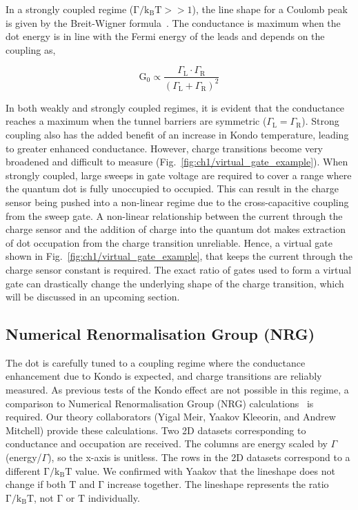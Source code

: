In a strongly coupled regime ($\mathrm{\Gamma/k_BT}>>1$), the line shape for a Coulomb peak is given by the Breit-Wigner formula~\cite{Breit1936}. The conductance is maximum when the dot energy is in line with the Fermi energy of the leads and depends on the coupling as,

\begin{equation}\label{eq:cond_amp_strong}
 \mathrm{G_0} \propto
 \frac{\Gamma_\mathrm{L}\cdot\Gamma_\mathrm{R}}{\left(\Gamma_\mathrm{L}+\Gamma_\mathrm{R}\right)^2}
\end{equation}

\noindent In both weakly and strongly coupled regimes, it is evident that the conductance reaches a maximum when the tunnel barriers are symmetric ($\Gamma_\mathrm{L}=\Gamma_\mathrm{R}$). Strong coupling also has the added benefit of an increase in Kondo temperature, leading to greater enhanced conductance. 
However, charge transitions become very broadened and difficult to measure (Fig.~\ref{fig:ch1/virtual_gate_example}). When strongly coupled, large sweeps in gate voltage are required to cover a range where the quantum dot is fully unoccupied to occupied. This can result in the charge sensor being pushed into a non-linear regime due to the cross-capacitive coupling from the sweep gate.
A non-linear relationship between the current through the charge sensor and the addition of charge into the quantum dot makes extraction of dot occupation from the charge transition unreliable. Hence, a virtual gate shown in Fig.~\ref{fig:ch1/virtual_gate_example}, that keeps the current through the charge sensor constant is required. The exact ratio of gates used to form a virtual gate can drastically change the underlying shape of the charge transition, which will be discussed in an upcoming section. 


\subsection{Numerical Renormalisation Group (NRG)}
The dot is carefully tuned to a coupling regime where the conductance enhancement due to Kondo is expected, and charge transitions are reliably measured. As previous tests of the Kondo effect are not possible in this regime, a comparison to Numerical Renormalisation Group (NRG) calculations~\cite{nrg} is required. Our theory collaborators (Yigal Meir, Yaakov Kleeorin, and Andrew Mitchell) provide these calculations. Two 2D datasets corresponding to conductance and occupation are received. The columns are energy scaled by $\Gamma$ (energy/$\Gamma$), so the x-axis is unitless. The rows in the 2D datasets correspond to a different $\mathrm{\Gamma/k_BT}$ value. We confirmed with Yaakov that the lineshape does not change if both $\mathrm{T}$ and $\mathrm{\Gamma}$ increase together. The lineshape represents the ratio $\mathrm{\Gamma/k_BT}$, not $\mathrm{\Gamma}$ or $\mathrm{T}$ individually.

